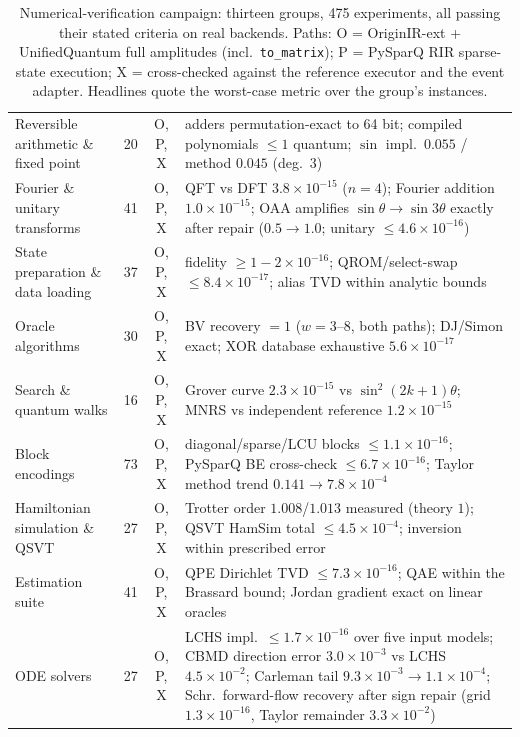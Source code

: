 \begin{table}[t]
  \centering
  \caption{Numerical-verification campaign: thirteen groups, 475 experiments,
  all passing their stated criteria on real backends.  Paths: O =
  OriginIR-ext + UnifiedQuantum full amplitudes (incl.\
  \texttt{to\_matrix}); P = PySparQ RIR sparse-state execution; X =
  cross-checked against the reference executor and the event adapter.
  Headlines quote the worst-case metric over the group's instances.}
  \label{tab:verify-matrix}
  \small
  \setlength{\tabcolsep}{4pt}\begin{tabular}{@{}p{3.6cm}ccp{8.6cm}@{}}
    \toprule
    \tabhead{Group} & \tabhead{cases} & \tabhead{paths} & \tabhead{headline metrics} \\
    \midrule
    Reversible arithmetic \& fixed point & 20 & O, P, X & adders permutation-exact to 64 bit; compiled polynomials $\le 1$ quantum; $\sin$ impl.\ $0.055$ / method $0.045$ (deg.\ 3) \\
    Fourier \& unitary transforms & 41 & O, P, X & QFT vs DFT $3.8{\times}10^{-15}$ ($n{=}4$); Fourier addition $1.0{\times}10^{-15}$; OAA amplifies $\sin\theta \to \sin 3\theta$ exactly after repair ($0.5 \to 1.0$; unitary $\le 4.6{\times}10^{-16}$) \\
    State preparation \& data loading & 37 & O, P, X & fidelity $\ge 1 - 2{\times}10^{-16}$; QROM/select-swap $\le 8.4{\times}10^{-17}$; alias TVD within analytic bounds \\
    Oracle algorithms & 30 & O, P, X & BV recovery $= 1$ ($w = 3$--$8$, both paths); DJ/Simon exact; XOR database exhaustive $5.6{\times}10^{-17}$ \\
    Search \& quantum walks & 16 & O, P, X & Grover curve $2.3{\times}10^{-15}$ vs $\sin^2(2k{+}1)\theta$; MNRS vs independent reference $1.2{\times}10^{-15}$ \\
    Block encodings & 73 & O, P, X & diagonal/sparse/LCU blocks $\le 1.1{\times}10^{-16}$; PySparQ BE cross-check $\le 6.7{\times}10^{-16}$; Taylor method trend $0.141 \to 7.8{\times}10^{-4}$ \\
    Hamiltonian simulation \& QSVT & 27 & O, P, X & Trotter order $1.008$/$1.013$ measured (theory $1$); QSVT HamSim total $\le 4.5{\times}10^{-4}$; inversion within prescribed error \\
    Estimation suite & 41 & O, P, X & QPE Dirichlet TVD $\le 7.3{\times}10^{-16}$; QAE within the Brassard bound; Jordan gradient exact on linear oracles \\
    ODE solvers & 27 & O, P, X & LCHS impl.\ $\le 1.7{\times}10^{-16}$ over five input models; CBMD direction error $3.0{\times}10^{-3}$ vs LCHS $4.5{\times}10^{-2}$; Carleman tail $9.3{\times}10^{-3} \to 1.1{\times}10^{-4}$; Schr.\ forward-flow recovery after sign repair (grid $1.3{\times}10^{-16}$, Taylor remainder $3.3{\times}10^{-2}$) \\

\end{tabular}
\end{table}
